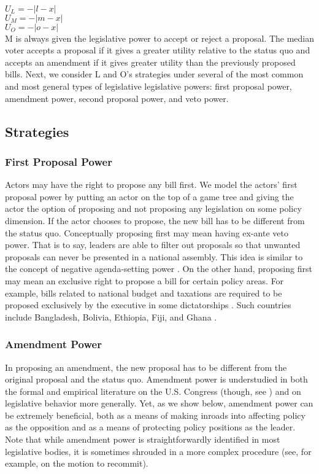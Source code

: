 \documentclass[12pt]{article}
\theoremstyle{plain}		      \newtheorem{assn}{Assumption}
\theoremstyle{plain}		      \newtheorem{prop}{Proposition}
\theoremstyle{plain}		      \newtheorem{lemma}{Lemma}
\theoremstyle{plain}	          \newtheorem{imp}{Implication}
\theoremstyle{plain}	          \newtheorem{hyp}{Hypothesis}
\theoremstyle{definition}		  \newtheorem{defn}{Definition}
\theoremstyle{remark}	          \newtheorem{rem}{Remark}
\theoremstyle{definition}         \newtheorem{case}{Case}
\begin{document}
\\
$U_L = -|l-x|$\\
$U_M = -|m-x|$\\
$U_O = -|o-x|$
\\
\indent M is always given the legislative power to accept or reject a proposal. The median voter accepts a proposal if it gives a greater utility relative to the status quo and accepts an amendment if it gives greater utility than the previously proposed bills. Next, we consider L and O's strategies under several of the most common and most general types of legislative legislative powers: first proposal power, amendment power, second proposal power, and veto power. 

\subsection{Strategies}
\subsubsection{First Proposal Power}
\indent Actors may have the right to propose any bill first. We model the actors' first proposal power by putting an actor on the top of a game tree and giving the actor the option of proposing and not proposing any legislation on some policy dimension. If the actor chooses to propose, the new bill has to be different from the status quo. Conceptually proposing first may mean having ex-ante veto power. That is to say, leaders are able to filter out proposals so that unwanted proposals can never be presented in a national assembly. This idea is similar to the concept of negative agenda-setting power \citep{coxmccubbins05}. On the other hand, proposing first may mean an exclusive right to propose a bill for certain policy areas. For example, bills related to national budget and taxations are required to be proposed exclusively by the executive in some dictatorships \citep{barkan09}. Such countries include Bangladesh, Bolivia, Ethiopia, Fiji, and Ghana \citep{ccpdata}. 
\subsubsection{Amendment Power}
\indent In proposing an amendment, the new proposal has to be different from the original proposal and the status quo. Amendment power is understudied in both the formal and empirical literature on the U.S. Congress (though, see \citet{monroeetal18}) and on legislative behavior more generally. Yet, as we show below, amendment power can be extremely beneficial, both as a means of making inroads into affecting policy as the opposition and as a means of protecting policy positions as the leader. Note that while amendment power is straightforwardly identified in most legislative bodies, it is sometimes shrouded in a more complex procedure (see, for example, \citet{roberts05} on the motion to recommit).
\end{document}
